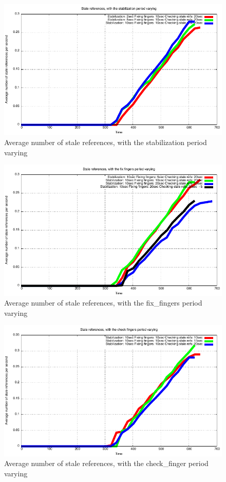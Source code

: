 \documentclass[a4paper, 11pt]{article}
\theoremstyle{plain}
\theoremstyle{definition}
\begin{document}
    \begin{figure}[h]
      \centering
      \includegraphics{plots/Average-SR-stabilization.pdf}
      \caption{Average number of stale references, with the stabilization period varying}
      \label{fig:Av-SR-stab}
    \end{figure}
    
    
    \begin{figure}[h]
      \centering
      \includegraphics{plots/Average-SR-fix-fingers.pdf}
      \caption{Average number of stale references, with the fix\_fingers period varying}
      \label{fig:Av-SR-fix-fingers}
    \end{figure}
    
    
    \begin{figure}[h]
      \centering
      \includegraphics{plots/Average-SR-check-finger.pdf}
      \caption{Average number of stale references, with the check\_finger period varying}
      \label{fig:Av-SR-check-finger}
    \end{figure}
\end{document}
